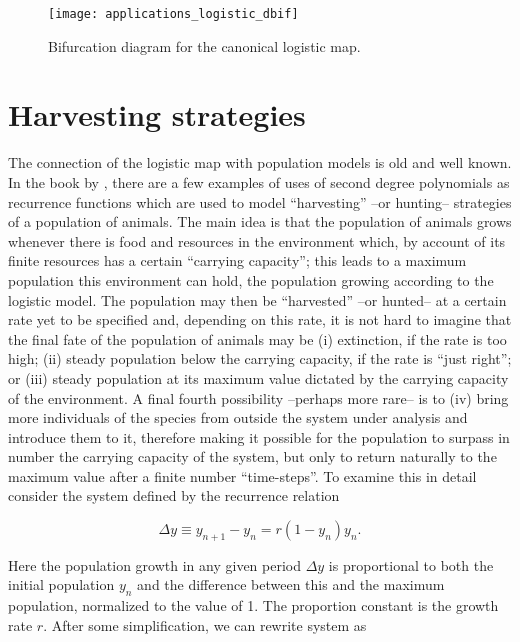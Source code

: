 \documentclass[10pt,twoside,titlepage]{book}
\numberwithin{equation}{chapter}
\numberwithin{figure}{chapter}
\numberwithin{table}{chapter}
\theoremstyle{plain}%
\theoremstyle{definition}
\theoremstyle{remark}
\begin{document}
\begin{figure}
	\centering
	\texttt{[image: applications\_logistic\_dbif]}
	\caption{Bifurcation diagram for the canonical logistic map.}
	\label{fig:dbif_logistic}
\end{figure}

\section{Harvesting strategies}

The connection of the logistic map with population models is old and well known. In the book by \cite{Sandefur}, there are a few examples of uses of second degree polynomials as recurrence functions which are used to model ``harvesting'' --or hunting-- strategies of a population of animals. The main idea is that the population of animals grows whenever there is food and resources in the environment which, by account of its finite resources has a certain ``carrying capacity''; this leads to a maximum population this environment can hold, the population growing according to the logistic model. The population may then be ``harvested'' --or hunted-- at a certain rate yet to be specified and, depending on this rate, it is not hard to imagine that the final fate of the population of animals may be (i) extinction, if the rate is too high; (ii) steady population below the carrying capacity, if the rate is ``just right''; or (iii) steady population at its maximum value dictated by the carrying capacity of the environment. A final fourth possibility --perhaps more rare-- is to (iv) bring more individuals of the species from outside the system under analysis and introduce them to it, therefore making it possible for the population to surpass in number the carrying capacity of the system, but only to return naturally to the maximum value after a finite number ``time-steps''. To examine this in detail consider the system defined by the recurrence relation

\begin{equation}\label{eq:harvest1}
	\Delta y\equiv y_{n+1}-y_n=r(1-y_n)y_n.
\end{equation}

Here the population growth in any given period $\Delta y$ is proportional to both the initial population $y_n$ and the difference between this and the maximum population, normalized to the value of 1. The proportion constant is the growth rate $r$. After some simplification, we can rewrite system as
\end{document}
